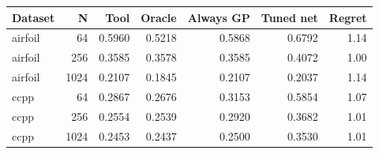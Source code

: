 \begin{tabular}{lrrrrrr}
\toprule
Dataset & N & Tool & Oracle & Always GP & Tuned net & Regret \\
\midrule
airfoil & 64 & 0.5960 & 0.5218 & 0.5868 & 0.6792 & 1.14 \\
airfoil & 256 & 0.3585 & 0.3578 & 0.3585 & 0.4072 & 1.00 \\
airfoil & 1024 & 0.2107 & 0.1845 & 0.2107 & 0.2037 & 1.14 \\
ccpp & 64 & 0.2867 & 0.2676 & 0.3153 & 0.5854 & 1.07 \\
ccpp & 256 & 0.2554 & 0.2539 & 0.2920 & 0.3682 & 1.01 \\
ccpp & 1024 & 0.2453 & 0.2437 & 0.2500 & 0.3530 & 1.01 \\
\bottomrule
\end{tabular}
